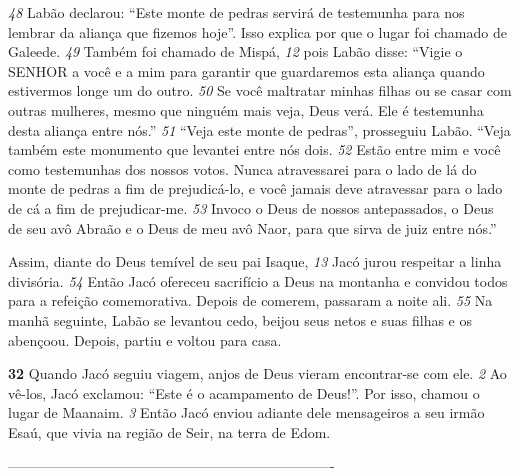\bigskip  
\textit{\tiny 48}
Labão declarou: “Este monte de pedras servirá de testemunha para nos
lembrar da aliança que fizemos hoje”. Isso explica por que o lugar foi chamado de
Galeede. 
\textit{\tiny 49}
Também foi chamado de Mispá,
\textit{\tiny 12}
 pois Labão disse: “Vigie o SENHOR a
você e a mim para garantir que guardaremos esta aliança quando estivermos
longe um do outro. 
\textit{\tiny 50}
Se você maltratar minhas filhas ou se casar com outras
mulheres, mesmo que ninguém mais veja, Deus verá. Ele é testemunha desta
aliança entre nós.”
\textit{\tiny 51}
“Veja este monte de pedras”, prosseguiu Labão. “Veja também este
monumento que levantei entre nós dois. 
\textit{\tiny 52}
Estão entre mim e você como
testemunhas dos nossos votos. Nunca atravessarei para o lado de lá do monte de
pedras a fim de prejudicá-lo, e você jamais deve atravessar para o lado de cá a fim
de prejudicar-me. 
\textit{\tiny 53}
Invoco o Deus de nossos antepassados, o Deus de seu avô
Abraão e o Deus de meu avô Naor, para que sirva de juiz entre nós.”

\bigskip  
   Assim, diante do Deus temível de seu pai Isaque,
\textit{\tiny 13}
 Jacó jurou respeitar a linha
divisória. 
\textit{\tiny 54}
Então Jacó ofereceu sacrifício a Deus na montanha e convidou todos
para a refeição comemorativa. Depois de comerem, passaram a noite ali.
\textit{\tiny 55}
 Na manhã seguinte, Labão se levantou cedo, beijou seus netos e suas filhas
e os abençoou. Depois, partiu e voltou para casa.

\bigskip  
\textbf{\large 32}
              Quando Jacó seguiu viagem, anjos de Deus vieram encontrar-se com
ele. 
\textit{\tiny 2} 
Ao vê-los, Jacó exclamou: “Este é o acampamento de Deus!”. Por isso, chamou
o lugar de Maanaim.
\textit{\tiny 3} 
Então Jacó enviou adiante dele mensageiros a seu irmão Esaú, que vivia na região
de Seir, na terra de Edom. 

----------------------------------------------------------------------
